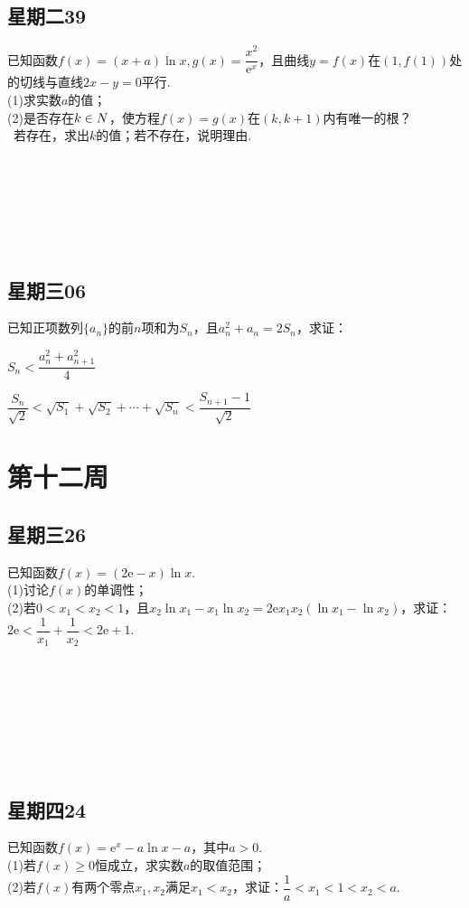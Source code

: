 \documentclass[UTF8,a4paper,11 pt]{ctexart}%
\newcommand\eu{\mathrm{e}}%
\let\mathbb\relax
\begin{document}
	\subsection{星期二39}\noindent
	已知函数$ f(x)=(x+a)\ln x, g(x)=\dfrac{x^2}{\eu^x} $，且曲线$ y=f(x) $在$ \left(1,f(1)\right) $处的切线与直线$ 2x-y=0 $平行.
	\\(1)求实数$ a $的值；
	\\(2)是否存在$ k\in\mathbb{N} $，使方程$ f(x)=g(x) $在$ (k,k+1) $内有唯一的根？
	\\\mbox{\quad\,} 若存在，求出$ k $的值；若不存在，说明理由. 
	\\\,\\\,\\\,\\\,\\\,\\\,
	\subsection{星期三06}\noindent
	已知正项数列$ \{a_n\} $的前$ n $项和为$ S_n $，且$ a_n^2+a_n=2S_n $，求证：\begin{xchoices}[label-style=quan,items=1]
	\item $ S_n<\dfrac{a_n^2+a_{n+1}^2}{4} $
	\item $ \dfrac{S_n}{\sqrt{2}}<\sqrt{S_1}+\sqrt{S_2}+\cdots+\sqrt{S_n}<\dfrac{S_{n+1}-1}{\sqrt{2}} $
	\end{xchoices}
	\section{第十二周}
	\subsection{星期三26}\noindent
	已知函数$ f(x)=(2\eu-x)\ln x $.
	\\(1)讨论$ f(x) $的单调性；
	\\(2)若$ 0<x_1<x_2<1 $，且$ x_2\ln x_1-x_1\ln x_2=2\eu x_1x_2(\ln x_1-\ln x_2) $，求证：$ 2\eu<\dfrac{1}{x_1}+\dfrac{1}{x_2}<2\eu+1 $.
	\\\,\\\,\\\,\\\,\\\,\\\,\\\,
	\subsection{星期四24}\noindent
	已知函数$ f(x)=\eu^x-a\ln x-a $，其中$ a>0 $.
	\\(1)若$ f(x)\ge0 $恒成立，求实数$ a $的取值范围；
	\\(2)若$ f(x) $有两个零点$ x_1,x_2 $满足$ x_1<x_2 $，求证：$ \dfrac{1}{a}<x_1<1<x_2<a $.
	\\\,\\\,\\\,\\\,\\\,\\\,\\\,
\end{document}
